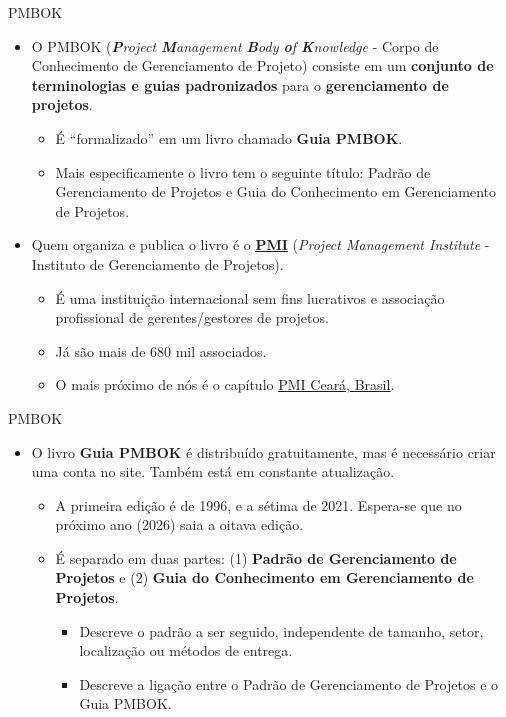 \documentclass{beamer}
\begin{document}
\begin{frame}{PMBOK}
	\begin{itemize}
		\justifying
		\item O \alert<2>{PMBOK} (\textit{\textbf{P}roject \textbf{M}anagement \textbf{B}ody \textbf{o}f \textbf{K}nowledge} - Corpo de Conhecimento de Gerenciamento de Projeto) consiste em um \textbf{conjunto de terminologias e guias padronizados} para o \textbf{gerenciamento de projetos}.
		\begin{itemize}
			\justifying
			\item<2> É ``formalizado'' em um livro chamado \textbf{Guia PMBOK}. 
			\item<2> Mais especificamente o livro tem o seguinte título: Padrão de Gerenciamento de Projetos e Guia do Conhecimento em Gerenciamento de Projetos.
		\end{itemize}
		\item<3-> Quem organiza e publica o livro é o \href{https://www.pmi.org/}{\underline{\textbf{PMI}}} (\textit{Project Management Institute} - \alert<4>{Instituto de Gerenciamento de Projetos}).
		\begin{itemize}
			\justifying
			\item<4> É uma instituição internacional sem fins lucrativos e associação profissional de gerentes/gestores de projetos.
			\item<4> Já são mais de 680 mil associados.
			\item<4> O mais próximo de nós é o capítulo \href{https://pmice.org.br/}{\underline{PMI Ceará, Brasil}}.
		\end{itemize}
	\end{itemize}
\end{frame}

\begin{frame}{PMBOK}
	\begin{itemize}
		\justifying
		\item O livro \textbf{Guia PMBOK} é distribuído gratuitamente, mas é necessário criar uma conta no site. Também \alert<2>{está em constante atualização}.
		\begin{itemize}
			\justifying
			\item<2> A primeira edição é de 1996, e a sétima de 2021. Espera-se que no próximo ano (2026) saia a oitava edição.
			\item<3-> É separado em duas partes: (1) \alert<4>{\textbf{Padrão de Gerenciamento de Projetos}} e (2) \alert<5>{\textbf{Guia do Conhecimento em Gerenciamento de Projetos}}.
			\begin{itemize}
				\justifying
				\item<4> Descreve o padrão a ser seguido, independente de tamanho, setor, localização ou métodos de entrega.
				\item<5> Descreve a ligação entre o Padrão de Gerenciamento de Projetos e o Guia PMBOK.
			\end{itemize}
		\end{itemize}
	\end{itemize}
\end{frame}
\end{document}
